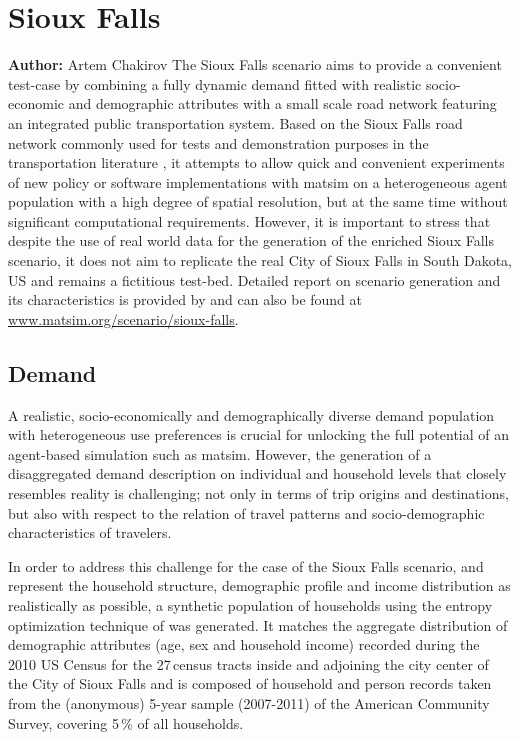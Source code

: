 \section{Sioux Falls}
\label{ch:scenarios:siouxfalls}
\hfill \textbf{Author:} Artem Chakirov
The Sioux Falls scenario aims to provide a convenient test-case by combining a fully dynamic demand fitted with realistic socio-economic and demographic attributes with a small scale road network featuring an integrated public transportation system. Based on the Sioux Falls road network commonly used for tests and demonstration purposes in the transportation literature \citep[][]{BarGera_TNTP_Webpage_2013}, it attempts to allow quick and convenient experiments of new policy or software implementations with \gls{matsim} on a heterogeneous agent population with a high degree of spatial resolution, but at the same time without significant computational requirements. However, it is important to stress that despite the use of real world data for the generation of the enriched Sioux Falls scenario, it does not aim to replicate the real City of Sioux Falls in South Dakota, US and remains a fictitious test-bed. Detailed report on scenario generation and its characteristics is provided by \citet[][]{ChakirovFourie_TechRep_FCL_2014} and can also be found at \url{www.matsim.org/scenario/sioux-falls}. 

\subsection{Demand}
A realistic, socio-economically and demographically diverse demand population with  heterogeneous use preferences is crucial for unlocking the full potential of an agent-based simulation such as \gls{matsim}. However, the generation of a disaggregated demand description on individual and household levels that closely resembles reality is challenging; not only in terms of trip origins and destinations, but also with respect to the relation of travel patterns and socio-demographic characteristics of travelers.

In order to address this challenge for the case of the Sioux Falls scenario, and represent the household structure, demographic profile and income distribution as realistically as possible, a synthetic population of households using the entropy optimization technique of \citet[][]{BarGeraEtAl_TRB_2009} was generated. It matches the aggregate distribution of demographic attributes (age, sex and household income) recorded during the 2010 US Census for the 27\,census tracts inside and adjoining the city center of the City of Sioux Falls and is composed of household and person records taken from the (anonymous) 5-year sample (2007-2011) of the American Community Survey, covering 5\,\% of all households.

